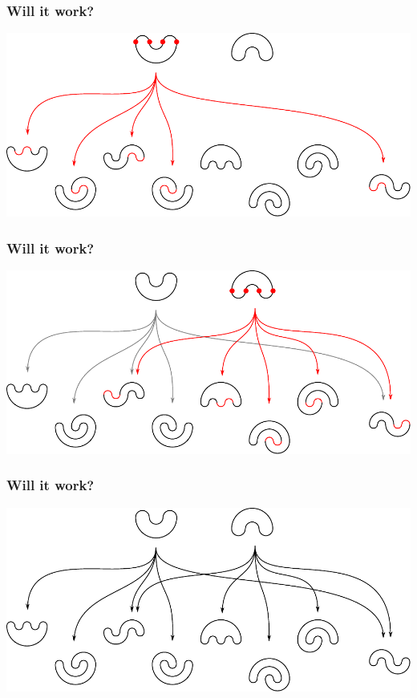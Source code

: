 \documentclass{beamer}
\begin{document}
\begin{frame}
\frametitle{Will it work?}
\begin{center}
\includegraphics[width=\textwidth]{meanders/2-into-3_2.pdf}
\end{center}
\end{frame}

\begin{frame}
\frametitle{Will it work?}
\begin{center}
\includegraphics[width=\textwidth]{meanders/2-into-3_3.pdf}
\end{center}
\end{frame}

\begin{frame}
\frametitle{Will it work?}
\begin{center}
\includegraphics[width=\textwidth]{meanders/2-into-3_4.pdf}
\end{center}
\end{frame}
\end{document}
